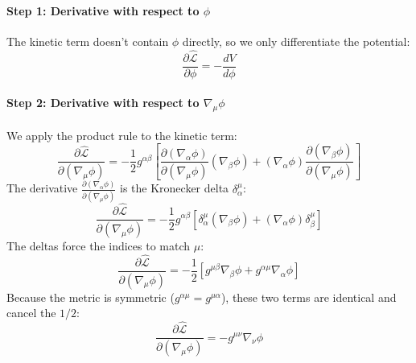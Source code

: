 \documentclass[11pt, a4paper]{report}
\begin{document}
\paragraph{Step 1: Derivative with respect to $\phi$}
The kinetic term doesn't contain $\phi$ directly, so we only differentiate the potential:
\begin{equation}
    \frac{\partial \hat{\mathcal{L}}}{\partial \phi} = - \frac{dV}{d\phi}
\end{equation}

\paragraph{Step 2: Derivative with respect to $\nabla_\mu \phi$}
We apply the product rule to the kinetic term:
\begin{equation}
    \frac{\partial \hat{\mathcal{L}}}{\partial (\nabla_\mu \phi)} = -\frac{1}{2} g^{\alpha\beta} \left[ \frac{\partial (\nabla_\alpha \phi)}{\partial (\nabla_\mu \phi)} (\nabla_\beta \phi) + (\nabla_\alpha \phi) \frac{\partial (\nabla_\beta \phi)}{\partial (\nabla_\mu \phi)} \right]
\end{equation}
The derivative $\frac{\partial (\nabla_\alpha \phi)}{\partial (\nabla_\mu \phi)}$ is the Kronecker delta $\delta_\alpha^\mu$:
\begin{equation}
    \frac{\partial \hat{\mathcal{L}}}{\partial (\nabla_\mu \phi)} = -\frac{1}{2} g^{\alpha\beta} \left[ \delta_\alpha^\mu (\nabla_\beta \phi) + (\nabla_\alpha \phi) \delta_\beta^\mu \right]
\end{equation}
The deltas force the indices to match $\mu$:
\begin{equation}
    \frac{\partial \hat{\mathcal{L}}}{\partial (\nabla_\mu \phi)} = -\frac{1}{2} \left[ g^{\mu\beta} \nabla_\beta \phi + g^{\alpha\mu} \nabla_\alpha \phi \right]
\end{equation}
Because the metric is symmetric ($g^{\alpha\mu} = g^{\mu\alpha}$), these two terms are identical and cancel the $1/2$:
\begin{equation}
    \frac{\partial \hat{\mathcal{L}}}{\partial (\nabla_\mu \phi)} = -g^{\mu\nu} \nabla_\nu \phi
\end{equation}
\end{document}
